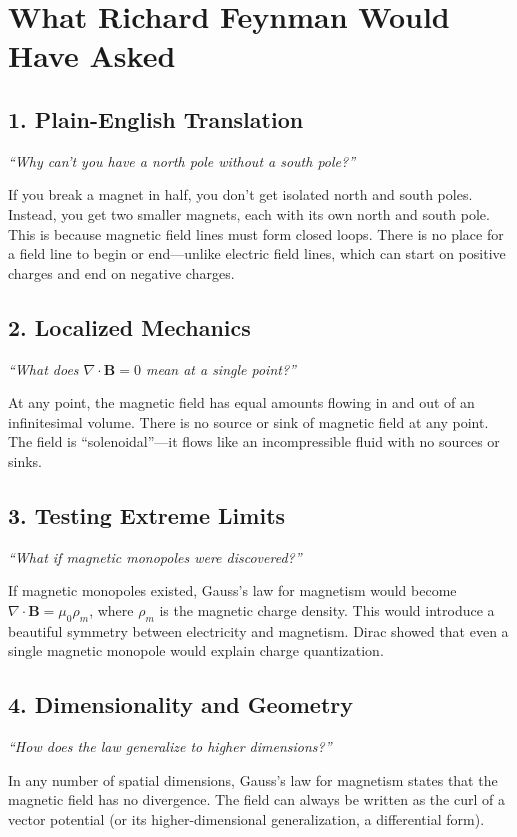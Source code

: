 \section*{What Richard Feynman Would Have Asked}

\subsection*{1. Plain-English Translation}
\textit{``Why can't you have a north pole without a south pole?''}

If you break a magnet in half, you don't get isolated north and south poles. Instead, you get two smaller magnets, each with its own north and south pole. This is because magnetic field lines must form closed loops. There is no place for a field line to begin or end---unlike electric field lines, which can start on positive charges and end on negative charges.

\subsection*{2. Localized Mechanics}
\textit{``What does $\nabla \cdot \mathbf{B} = 0$ mean at a single point?''}

At any point, the magnetic field has equal amounts flowing in and out of an infinitesimal volume. There is no source or sink of magnetic field at any point. The field is ``solenoidal''---it flows like an incompressible fluid with no sources or sinks.

\subsection*{3. Testing Extreme Limits}
\textit{``What if magnetic monopoles were discovered?''}

If magnetic monopoles existed, Gauss's law for magnetism would become $\nabla \cdot \mathbf{B} = \mu_0 \rho_m$, where $\rho_m$ is the magnetic charge density. This would introduce a beautiful symmetry between electricity and magnetism. Dirac showed that even a single magnetic monopole would explain charge quantization.

\subsection*{4. Dimensionality and Geometry}
\textit{``How does the law generalize to higher dimensions?''}

In any number of spatial dimensions, Gauss's law for magnetism states that the magnetic field has no divergence. The field can always be written as the curl of a vector potential (or its higher-dimensional generalization, a differential form).

